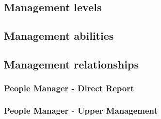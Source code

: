 
\subsection{Management levels}
\label{sub-sec:levels}
\newline

\subsection{Management abilities}

\subsection{Management relationships}
\label{sub-sec:relationships}

\subsubsection{People Manager - Direct Report}
\label{sub-sub-sec:pmdr}
 \newline

\subsubsection{People Manager - Upper Management}
\label{sub-sub-sec:pmum}
 \newline

